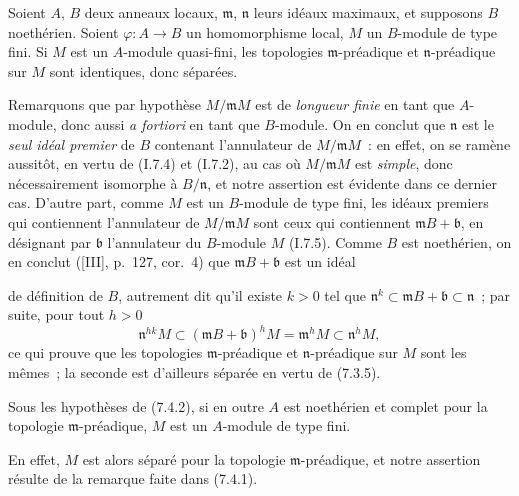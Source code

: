 \begin{proposition}[7.4.2]
\label{0.7.4.2-fr}
Soient $A$, $B$ deux anneaux locaux, $\mathfrak m$, $\mathfrak n$ leurs idéaux
maximaux, et supposons $B$ noethérien. Soient $\varphi:A\to B$ un
homomorphisme local, $M$ un $B$-module de type fini. Si $M$ est un $A$-module
quasi-fini, les topologies $\mathfrak m$-préadique et $\mathfrak n$-préadique
sur $M$ sont identiques, donc séparées.
\end{proposition}

Remarquons que par hypothèse $M/\mathfrak mM$ est de \emph{longueur finie} en
tant que $A$-module, donc aussi \emph{a fortiori} en tant que $B$-module. On en
conclut que $\mathfrak n$ est le \emph{seul idéal premier} de $B$ contenant
l'annulateur de $M/\mathfrak mM$~: en effet, on se ramène aussitôt, en vertu
de (I.7.4) et (I.7.2), au cas où $M/\mathfrak mM$ est \emph{simple}, donc
nécessairement isomorphe à $B/\mathfrak n$, et notre assertion est évidente
dans ce dernier cas. D'autre part, comme $M$ est un $B$-module de type fini,
les idéaux premiers qui contiennent l'annulateur de $M/\mathfrak mM$ sont ceux
qui contiennent $\mathfrak mB+\mathfrak b$, en désignant par $\mathfrak b$
l'annulateur du $B$-module $M$ (I.7.5). Comme $B$ est noethérien, on en conclut
([III], p.~127, cor.~4) que $\mathfrak mB+\mathfrak b$ est un idéal


de définition de $B$, autrement dit qu'il existe $k>0$ tel que
$\mathfrak n^k\subset\mathfrak mB+\mathfrak b\subset\mathfrak n$~; par suite,
pour tout $h>0$
\[
  \mathfrak n^{hk}M
  \subset(\mathfrak mB+\mathfrak b)^hM
  =\mathfrak m^hM
  \subset\mathfrak n^hM,
\]
ce qui prouve que les topologies $\mathfrak m$-préadique et
$\mathfrak n$-préadique sur $M$ sont les mêmes~; la seconde est d'ailleurs
séparée en vertu de (7.3.5).

\begin{corollary}[7.4.3]
\label{0.7.4.3-fr}
Sous les hypothèses de (7.4.2), si en outre $A$ est noethérien et complet pour
la topologie $\mathfrak m$-préadique, $M$ est un $A$-module de type fini.
\end{corollary}

En effet, $M$ est alors séparé pour la topologie $\mathfrak m$-préadique, et
notre assertion résulte de la remarque faite dans (7.4.1).

